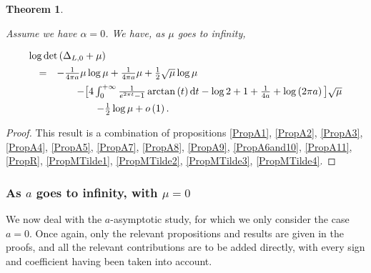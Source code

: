 \documentclass{jams-l}
\newtheorem{theorem}{Theorem}[section]
\theoremstyle{definition}
\theoremstyle{remark}
\numberwithin{equation}{section}
\begin{document}
            \begin{theorem}
            \label{ThmAlpha0Mu}
        
                Assume we have $\alpha = 0$. We have, as $\mu$ goes to infinity,
            
                \[ \begin{array}{lll}
                        \multicolumn{3}{l}{\log \det \left( \Delta_{L,0} + \mu \right)} \\[0.5em]
                    
                        & = & - \frac{1}{4 \pi a} \mu \log \mu + \frac{1}{4 \pi a} \mu + \frac{1}{2} \sqrt{\mu} \log \mu \\[0.5em]
                    
                        && \qquad - \big[ 4 \int_0^{+ \infty} \frac{1}{e^{2 \pi t} - 1} \arctan \left( t \right) \mathrm{d}t - \log 2 + 1 + \frac{1}{4a} + \log \left( 2 \pi a \right) \big] \sqrt{\mu} \\[0.5em]
                    
                        && \qquad \qquad - \frac{1}{2} \log \mu + o \left( 1 \right).
                    \end{array} \]
        
            \end{theorem}
        
            \begin{proof}
        
                This result is a combination of propositions \ref{PropA1}, \ref{PropA2}, \ref{PropA3}, \ref{PropA4}, \ref{PropA5}, \ref{PropA7}, \ref{PropA8}, \ref{PropA9}, \ref{PropA6and10}, \ref{PropA11}, \ref{PropR}, \ref{PropMTilde1}, \ref{PropMTilde2}, \ref{PropMTilde3}, \ref{PropMTilde4}.
        
            \end{proof}
            
            
        \subsubsection{As $a$ goes to infinity, with $\mu = 0$}
        
            We now deal with the $a$-asymptotic study, for which we only consider the case $a = 0$. Once again, only the relevant propositions and results are given in the proofs, and all the relevant contributions are to be added directly, with every sign and coefficient having been taken into account.
            
\end{document}
